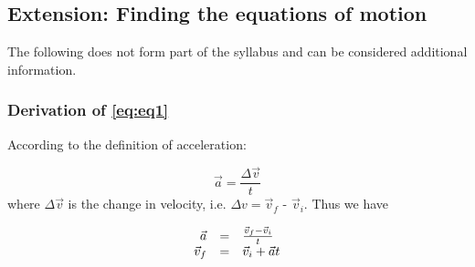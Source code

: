 \subsection*{Extension: Finding the equations of motion}
            \nopagebreak
        \label{m38796*id76225}The following does not form part of the syllabus and can be considered additional information.\par 
        \label{m38796*uid135}
            \subsubsection*{Derivation of \ref{eq:eq1}}
            \nopagebreak
          \label{m38796*id76242}According to the definition of acceleration:\par 
          \label{m38796*id76246}\nopagebreak\noindent{}
            
    \begin{equation*}
    \vec{a}=\frac{\Delta \vec{v}}{t}
      \end{equation*}
          \label{m38796*id76270}where $\Delta \vec{v}$ is the change in velocity, i.e. $\Delta v=\vec{v}_{f}$ - $\vec{v}_{i}$.
Thus we have\par 
          \label{m38796*id76324}\nopagebreak\noindent{}
            
    \begin{equation*}
    \begin{array}{ccc}\hfill \vec{a}& =& \frac{\vec{v}_{f}-\vec{v}_{i}}{t}\hfill \\ \hfill \vec{v}_{f}& =& \vec{v}_{i}+\vec{a}t\hfill \end{array}
      \end{equation*}
        \label{m38796*uid136}
